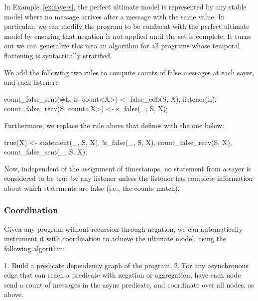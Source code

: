 In Example~\ref{ex:sayers}, the perfect ultimate model is represented by any stable model where no  message arrives after a  message with the same value.  In particular, we can modify the program to be confluent with the perfect ultimate model by ensuring that negation is not applied until the  set is complete.  It turns out we can generalize this into an algorithm for all \lang programs whose temporal flattening is syntactically stratified.

We add the following two rules to compute counts of false messages at each sayer, and each listener:

\begin{Dedalus}
count_false_sent(#L, S, count<X>) <- false_edb(S, X),
                                     listener(L);
count_false_recv(S, count<X>) <- s_false(_, S, X);
\end{Dedalus}

Furthermore, we replace the rule above that defines  with the one below:

\begin{Dedalus}
true(X) <- statement(_, S, X), !s_false(_, S, X),
           count_false_recv(S, X),
           count_false_sent(_, S, X);
\end{Dedalus}

Now, independent of the assignment of timestamps, no statement from a sayer  is considered to be true by any listener unless the listener has complete information about which statements are false (i.e., the counts match). 



\subsubsection{Coordination}
Given any \lang program without recursion through negation, we can automatically instrument it with coordination to achieve the ultimate model, using the following algorithm:

1. Build a predicate dependency graph of the program.
2. For any asynchronous edge that can reach a predicate with negation or aggregation, have each node send a count of messages in the async predicate, and coordinate over all nodes, as above.

